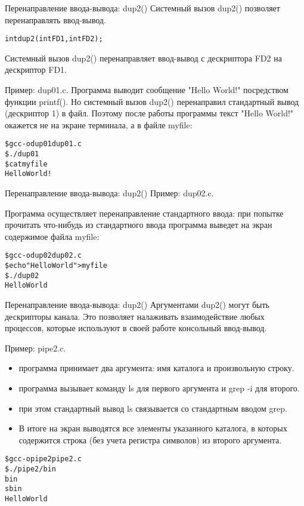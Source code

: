 \documentclass{beamer}
\begin{document}
\begin{frame}[fragile]{Перенаправление ввода-вывода: dup2()}
Системный вызов dup2() позволяет перенаправлять ввод-вывод. 
\begin{alltt}
int dup2 (int FD1, int FD2);
\end{alltt}
Системный вызов dup2() перенаправляет ввод-вывод с дескриптора FD2 на дескриптор FD1. 

Пример: dup01.c. Программа выводит сообщение "Hello World!" посредством функции printf().
Но системный вызов dup2() перенаправил стандартный вывод (дескриптор 1) в файл. Поэтому после работы программы текст "Hello World!" окажется не на экране терминала, а в файле myfile:
\begin{alltt}
\$ gcc -o dup01 dup01.c
\$ ./dup01
\$ cat myfile
Hello World!
\end{alltt}
\end{frame}

\begin{frame}[fragile]{Перенаправление ввода-вывода: dup2()}
Пример: dup02.c. 

Программа осуществляет перенаправление стандартного ввода: при попытке прочитать что-нибудь из стандартного ввода программа выведет на экран содержимое файла myfile:
\begin{alltt}
\$ gcc -o dup02 dup02.c
\$ echo "Hello World" > myfile
\$ ./dup02
Hello World
\end{alltt}
\end{frame}


\begin{frame}[fragile]{Перенаправление ввода-вывода: dup2()}
Аргументами dup2() могут быть дескрипторы канала. Это позволяет налаживать взаимодействие любых процессов, которые используют в своей работе консольный ввод-вывод. 

Пример: pipe2.c. 
\begin{itemize}
\item программа принимает два аргумента: имя каталога и произвольную строку. 
\item программа вызывает команду ls для первого аргумента и grep -i для второго. 
\item при этом стандартный вывод ls связывается со стандартным вводом grep. 
\item В итоге на экран выводятся все элементы указанного каталога, в которых содержится строка (без учета регистра символов) из второго аргумента.
\end{itemize}
\begin{alltt}
\$ gcc -o pipe2 pipe2.c
\$ ./pipe2 / bin
bin
sbin
Hello World
\end{alltt}
\end{frame}
\end{document}
